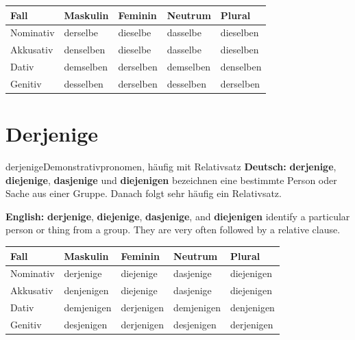 \documentclass[a4paper,11pt]{article}
\newcommand{\GermanText}[1]{\textbf{Deutsch: }#1\par}
\newcommand{\EnglishText}[1]{{\small\color{SoftGray}\textbf{English: }#1\par}}
\newcommand{\HeaderRow}{\rowcolor{HeaderBlueDark}\color{white}\bfseries Fall & \color{white}\bfseries Maskulin & \color{white}\bfseries Feminin & \color{white}\bfseries Neutrum & \color{white}\bfseries Plural \\}
\begin{document}
\begin{center}
\begin{tabular}{|>{\centering\arraybackslash}m{2.2cm}|>{\centering\arraybackslash}m{2.5cm}|>{\centering\arraybackslash}m{2.5cm}|>{\centering\arraybackslash}m{2.5cm}|>{\centering\arraybackslash}m{2.5cm}|}
\hline
\HeaderRow
\hline
\rowcolor{RowBlueLight}Nominativ & derselbe & dieselbe & dasselbe & dieselben \\
\hline
\rowcolor{RowBlueDark}Akkusativ & denselben & dieselbe & dasselbe & dieselben \\
\hline
\rowcolor{RowBlueLight}Dativ & demselben & derselben & demselben & denselben \\
\hline
\rowcolor{RowBlueDark}Genitiv & desselben & derselben & desselben & derselben \\
\hline
\end{tabular}
\end{center}

\section{Derjenige}
\begin{grammarentry}{derjenige}{Demonstrativpronomen, häufig mit Relativsatz}
\GermanText{\textbf{derjenige}, \textbf{diejenige}, \textbf{dasjenige} und \textbf{diejenigen} bezeichnen eine bestimmte Person oder Sache aus einer Gruppe. Danach folgt sehr häufig ein Relativsatz.}
\EnglishText{\textbf{derjenige}, \textbf{diejenige}, \textbf{dasjenige}, and \textbf{diejenigen} identify a particular person or thing from a group. They are very often followed by a relative clause.}
\end{grammarentry}

\begin{center}
\begin{tabular}{|>{\centering\arraybackslash}m{2.2cm}|>{\centering\arraybackslash}m{2.5cm}|>{\centering\arraybackslash}m{2.5cm}|>{\centering\arraybackslash}m{2.5cm}|>{\centering\arraybackslash}m{2.5cm}|}
\hline
\HeaderRow
\hline
\rowcolor{RowBlueLight}Nominativ & derjenige & diejenige & dasjenige & diejenigen \\
\hline
\rowcolor{RowBlueDark}Akkusativ & denjenigen & diejenige & dasjenige & diejenigen \\
\hline
\rowcolor{RowBlueLight}Dativ & demjenigen & derjenigen & demjenigen & denjenigen \\
\hline
\rowcolor{RowBlueDark}Genitiv & desjenigen & derjenigen & desjenigen & derjenigen \\
\hline
\end{tabular}
\end{center}
\end{document}
